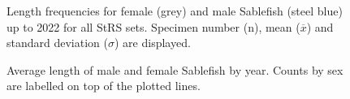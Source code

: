 \documentclass[12pt]{article}\usepackage[]{graphicx}\usepackage[]{color}
\begin{document}
\begin{figure}[htb]

{\centering {} 

}

\caption{Length frequencies for female (grey) and male Sablefish (steel blue) up to 2022 for all StRS sets. Specimen number (n), mean (\(\overline{x}\)) and standard deviation (\(\sigma\)) are displayed.}\label{fig:figure12}
\end{figure}

\begin{figure}[htb]

{\centering {} 

}

\caption{Average length of male and female Sablefish by year. Counts by sex are labelled on top of the plotted lines.}\label{fig:figure13}
\end{figure}
\clearpage
\end{document}

